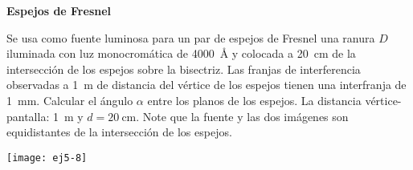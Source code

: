 




\item 
\textbf{Espejos de Fresnel}\\
\begin{minipage}[t][3.75cm]{0.6\textwidth}
Se usa como fuente luminosa para un par de espejos de Fresnel una ranura $D$ iluminada con luz monocromática de \SI{4000}{\angstrom} y colocada a \SI{20}{\centi\metre} de la intersección de los espejos sobre la bisectriz.
Las franjas de interferencia observadas a \SI{1}{\metre}  de distancia del vértice de los espejos tienen una interfranja de \SI{1}{\milli\metre}.
Calcular el ángulo $\alpha$ entre los planos de los espejos.
La distancia vértice-pantalla: \SI{1}{\metre} y $d = \SI{20}{\centi\metre}$.
Note que la fuente y las dos imágenes son equidistantes de la intersección de los espejos. 
\end{minipage}
\begin{minipage}[c][1cm][t]{0.35\textwidth}
	\texttt{[image: ej5-8]}
\end{minipage}



